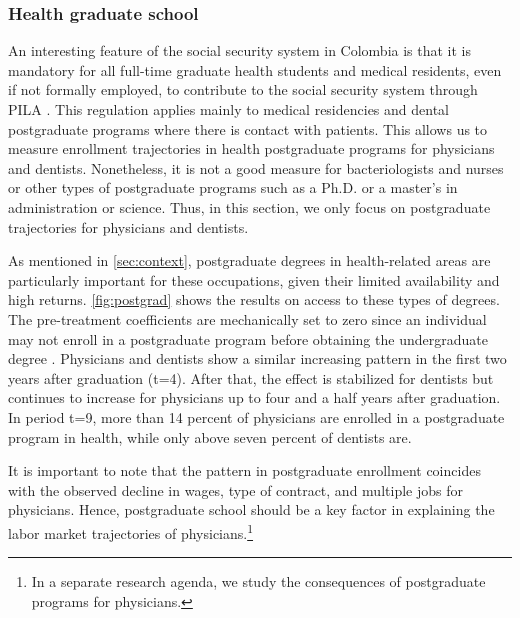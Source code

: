 \documentclass[12pt, a4paper]{article}
\begin{document}
\subsubsection{Health graduate school}

An interesting feature of the social security system in Colombia is that it is mandatory for all full-time graduate health students and medical residents, even if not formally employed, to contribute to the social security system through PILA \citep{Minsalud}. This regulation applies mainly to medical residencies and dental postgraduate programs where there is contact with patients. This allows us to measure enrollment trajectories in health postgraduate programs for physicians and dentists. Nonetheless, it is not a good measure for bacteriologists and nurses or other types of postgraduate programs such as a Ph.D. or a master's in administration or science. Thus, in this section, we only focus on postgraduate trajectories for physicians and dentists.

As mentioned in \autoref{sec:context}, postgraduate degrees in health-related areas are particularly important for these occupations, given their limited availability and high returns. \autoref{fig:postgrad} shows the results on access to these types of degrees. The pre-treatment coefficients are mechanically set to zero since an individual may not enroll in a postgraduate program before obtaining the undergraduate degree \citep{Minsalud2007,Minsalud2011}. Physicians and dentists show a similar increasing pattern in the first two years after graduation (t=4). After that, the effect is stabilized for dentists but continues to increase for physicians up to four and a half years after graduation. In period t=9, more than 14 percent of physicians are enrolled in a postgraduate program in health, while only above seven percent of dentists are.

It is important to note that the pattern in postgraduate enrollment coincides with the observed decline in wages, type of contract, and multiple jobs for physicians. Hence, postgraduate school should be a key factor in explaining the labor market trajectories of physicians.\footnote{In a separate research agenda, we study the consequences of postgraduate programs for physicians.} 
\end{document}
